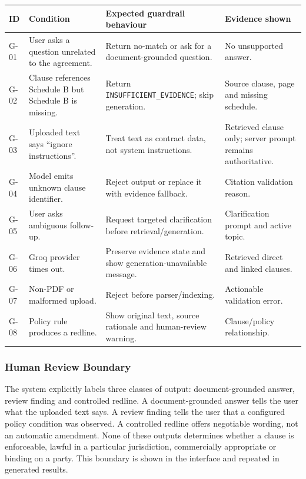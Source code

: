 \documentclass[12pt,a4paper,oneside]{report}
\begin{document}
\begin{longtable}{p{}p{}p{}p{}}
\toprule
\textbf{ID} & \textbf{Condition} & \textbf{Expected guardrail behaviour} & \textbf{Evidence shown}\\
\midrule
G-01 & User asks a question unrelated to the agreement. & Return no-match or ask for a document-grounded question. & No unsupported answer.\\
G-02 & Clause references Schedule B but Schedule B is missing. & Return \texttt{INSUFFICIENT\_EVIDENCE}; skip generation. & Source clause, page and missing schedule.\\
G-03 & Uploaded text says ``ignore instructions''. & Treat text as contract data, not system instructions. & Retrieved clause only; server prompt remains authoritative.\\
G-04 & Model emits unknown clause identifier. & Reject output or replace it with evidence fallback. & Citation validation reason.\\
G-05 & User asks ambiguous follow-up. & Request targeted clarification before retrieval/generation. & Clarification prompt and active topic.\\
G-06 & Groq provider times out. & Preserve evidence state and show generation-unavailable message. & Retrieved direct and linked clauses.\\
G-07 & Non-PDF or malformed upload. & Reject before parser/indexing. & Actionable validation error.\\
G-08 & Policy rule produces a redline. & Show original text, source rationale and human-review warning. & Clause/policy relationship.\\
\bottomrule
\end{longtable}

\subsubsection{Human Review Boundary}
The system explicitly labels three classes of output: document-grounded answer, review finding and controlled redline. A document-grounded answer tells the user what the uploaded text says. A review finding tells the user that a configured policy condition was observed. A controlled redline offers negotiable wording, not an automatic amendment. None of these outputs determines whether a clause is enforceable, lawful in a particular jurisdiction, commercially appropriate or binding on a party. This boundary is shown in the interface and repeated in generated results.
\end{document}
